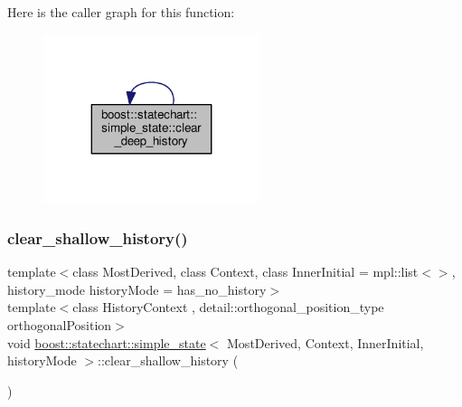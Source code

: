 Here is the caller graph for this function\+:
\nopagebreak
\begin{figure}[H]
\begin{center}
\leavevmode
\includegraphics[width=179pt]{classboost_1_1statechart_1_1simple__state_a23ca1de9d37765cf77884222e0491a5e_icgraph}
\end{center}
\end{figure}
\mbox{\label{classboost_1_1statechart_1_1simple__state_a6a338130243f1ad8fa655e4dd3e57ca2}} 
\subsubsection{\texorpdfstring{clear\+\_\+shallow\+\_\+history()}{clear\_shallow\_history()}}
{\footnotesize\ttfamily template$<$class Most\+Derived, class Context, class Inner\+Initial = mpl\+::list$<$$>$, history\+\_\+mode history\+Mode = has\+\_\+no\+\_\+history$>$ \\
template$<$class History\+Context , detail\+::orthogonal\+\_\+position\+\_\+type orthogonal\+Position$>$ \\
void \mbox{\hyperlink{classboost_1_1statechart_1_1simple__state}{boost\+::statechart\+::simple\+\_\+state}}$<$ Most\+Derived, Context, Inner\+Initial, history\+Mode $>$\+::clear\+\_\+shallow\+\_\+history (\begin{DoxyParamCaption}{ }\end{DoxyParamCaption})\hspace{0.3cm}{\ttfamily [inline]}}

